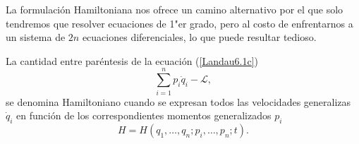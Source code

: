 \documentclass[12pt, spanish, a4paper, ]{article}
\begin{document}
La formulación Hamiltoniana nos ofrece un camino alternativo por el que solo tendremos que resolver ecuaciones de 1"er grado, pero al costo de enfrentarnos a un sistema de \(2n\) ecuaciones diferenciales, lo que puede resultar tedioso.

La cantidad entre paréntesis de la ecuación (\ref{Landau6.1c}) 
\begin{equation}\label{Lanczos62.3}
	\sum_{i=1}^n p_i \dot{q}_i - \mathcal{L} ,
    \tag{Lanczos 62.3}
\end{equation}
se denomina Hamiltoniano cuando se expresan todos las velocidades generalizas \(\dot{q}_i\) en función de los correspondientes momentos generalizados \(p_i\)
\begin{equation}\label{Lanczos62.4}
	H =  H(q_1,\ldots, q_n;p_i, \ldots, p_n; t) .
    \tag{Lanczos 62.4}
\end{equation}
\end{document}
